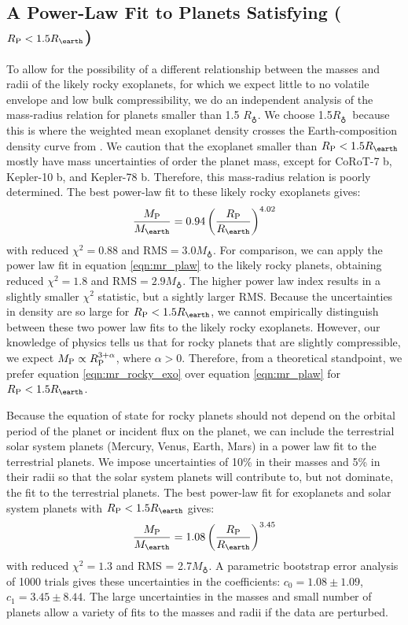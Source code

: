 \documentclass[iop]{emulateapj}
\newcommand{\rpl}{\ensuremath{R_{\rm P}}}
\newcommand{\mpl}{\ensuremath{M_{\rm P}}}
\newcommand{\rearth}{\ensuremath{R_\earth}}
\newcommand{\mearth}{\ensuremath{M_\earth}}
\begin{document}
\subsection{A Power-Law Fit to Planets Satisfying ($\rpl < 1.5 \rearth$)}
To allow for the possibility of a different relationship between the masses and radii of the likely rocky exoplanets, for which we expect little to no volatile envelope and low bulk compressibility, we do an independent analysis of the mass-radius relation for planets smaller than 1.5 \rearth.  We choose 1.5\rearth\ because this is where the weighted mean exoplanet density crosses the Earth-composition density curve from \citet[][see Figure \ref{fig:rm_4}]{Seager2007}.  We caution that the exoplanet smaller than $\rpl < 1.5 \rearth$ mostly have mass uncertainties of order the planet mass, except for CoRoT-7 b, Kepler-10 b, and Kepler-78 b.  Therefore, this mass-radius relation is poorly determined.  The best power-law fit to these likely rocky exoplanets gives:
\begin{equation}
\frac{\mpl}{\mearth} = 0.94 \left(\frac{\rpl}{\rearth}\right)^{4.02}
\label{eqn:mr_rocky_exo}
\end{equation}
with reduced $\chi^2 = 0.88$ and RMS$ = 3.0 \mearth$.  For comparison, we can apply the power law fit in equation \ref{eqn:mr_plaw} to the likely rocky planets, obtaining reduced $\chi^2 = 1.8$ and RMS$ = 2.9\mearth$.  The higher power law index results in a slightly smaller $\chi^2$ statistic, but a sightly larger RMS.  Because the uncertainties in density are so large for $\rpl < 1.5 \rearth$, we cannot empirically distinguish between these two power law fits to the likely rocky exoplanets.  However, our knowledge of physics tells us that for rocky planets that are slightly compressible, we expect $\mpl \propto \rpl^{3 + \alpha}$, where $\alpha > 0$.  Therefore, from a theoretical standpoint, we prefer equation \ref{eqn:mr_rocky_exo} over equation \ref{eqn:mr_plaw} for $\rpl < 1.5 \rearth$.

Because the equation of state for rocky planets should not depend on the orbital period of the planet or incident flux on the planet, we can include the terrestrial solar system planets (Mercury, Venus, Earth, Mars) in a power law fit to the terrestrial planets.  We impose uncertainties of 10\% in their masses and 5\% in their radii so that the solar system planets will contribute to, but not dominate, the fit to the terrestrial planets.  The best power-law fit for exoplanets and solar system planets with $\rpl < 1.5 \rearth$ gives:
\begin{equation}
\frac{\mpl}{\mearth} = 1.08 \left(\frac{\rpl}{\rearth}\right)^{3.45}
\label{eqn:mr_rocky}
\end{equation}
with reduced $\chi^2 = 1.3$ and RMS = 2.7\mearth.  A parametric bootstrap error analysis of 1000 trials gives these uncertainties in the coefficients: $c_0 =1.08 \pm 1.09$, $c_1 = 3.45\pm 8.44$.  The large uncertainties in the masses and small number of planets allow a variety of fits to the masses and radii if the data are perturbed.  
\end{document}
